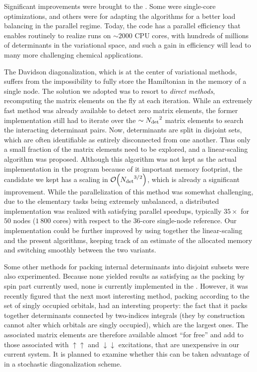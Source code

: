\documentclass[12pt,a4paper]{report}
\begin{document}
Significant improvements were brought to the \QP. Some were single-core
optimizations, and others were for adapting the algorithms for a better load
balancing in the parallel regime. Today, the code has a parallel efficiency
that enables routinely to realize runs on $\sim 2000$ CPU cores, with
hundreds of millions of determinants in the variational space, and such a gain
in efficiency will lead to many more challenging chemical applications.

The Davidson diagonalization, which is at the center of variational methods, suffers from the impossibility to fully store the Hamiltonian in the memory of a single node. The solution we adopted was to resort to \emph{direct methods}, recomputing the matrix elements on the fly at each iteration. While an extremely fast method was already available to detect zero matrix elements,\cite{Scemama_2013} the former implementation still had to iterate over the $\sim {N_\text{det}}^2$ matrix elements to search the interacting determinant pairs. Now, determinants are split in disjoint sets, which are often identifiable as entirely disconnected from one another. Thus only a small fraction of the matrix elements need to be explored, and a linear-scaling algorithm was proposed. Although this algorithm was not kept as the actual implementation in the program because of it important memory footprint, the candidate we kept has a scaling in $\order{\Ndet^{3/2}}$, which is already a significant improvement.
While the parallelization of this method was somewhat challenging, due to the elementary tasks being extremely unbalanced, a distributed implementation was realized with satisfying parallel speedups, typically $35\times$ for $50$ nodes ($1~800$ cores) with respect to the $36$-core single-node reference.
Our implementation could be further improved by using together the linear-scaling and the present
algorithms, keeping track of an estimate of the allocated memory and switching smoothly between the
two variants.

Some other methods for packing internal determinants into disjoint subsets were also experimented. Because none yielded results as satisfying as the packing by spin part currently used, none is currently implemented in the \QP. However, it was recently figured that the next most interesting method, packing according to the set of singly occupied orbitals, had an intersting property: the fact that it packs together determinants connected by two-indices integrals (they by construction cannot alter which orbitals are singly occupied), which are the largest ones. The associated matrix elements are therefore available almost ``for free'' and add to those associated with $\uparrow \uparrow$ and $\downarrow \downarrow$ excitations, that are unexpensive in our current system. It is planned to examine whether this can be taken advantage of in a stochastic diagonalization scheme.
\end{document}
